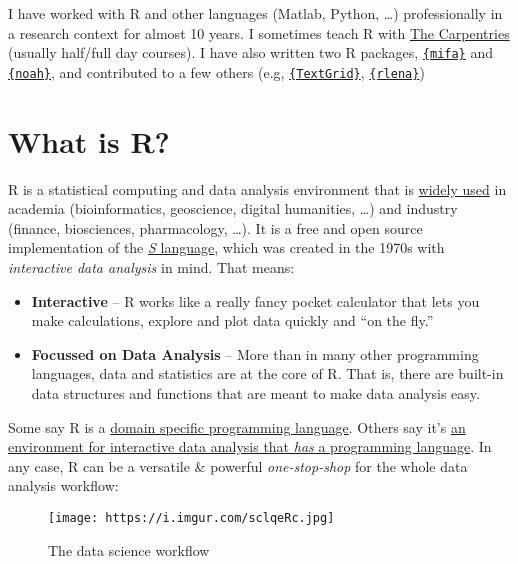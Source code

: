 \documentclass[
]{book}
\providecommand{\tightlist}{%
  \setlength{\itemsep}{0pt}\setlength{\parskip}{0pt}}
\begin{document}
I have worked with R and other languages (Matlab, Python, \ldots)
professionally in a research context for almost 10 years. I sometimes
teach R with
\href{https://www.ub.uio.no/english/writing-publishing/dsc/carpentry-uio/}{The
Carpentries} (usually half/full day courses). I have also written two R
packages, \href{https://teebusch.github.io/mifa/}{\texttt{\{mifa\}}} and
\href{https://teebusch.github.io/noah/}{\texttt{\{noah\}}}, and
contributed to a few others (e.g,
\href{https://github.com/patrickreidy/textgRid}{\texttt{\{TextGrid\}}},
\href{https://github.com/HomeBankCode/rlena}{\texttt{\{rlena\}}})

\hypertarget{what-is-r}{%
\section{What is R?}\label{what-is-r}}

R is a statistical computing and data analysis environment that is
\href{https://www.tiobe.com/tiobe-index/r/}{widely used} in academia
(bioinformatics, geoscience, digital humanities, \ldots) and industry
(finance, biosciences, pharmacology, \ldots). It is a free and open
source implementation of the
\href{https://en.wikipedia.org/wiki/S_(programming_language)}{\emph{S}
language}, which was created in the 1970s with \emph{interactive data
analysis} in mind. That means:

\begin{itemize}
\tightlist
\item
  \textbf{Interactive} -- R works like a really fancy pocket calculator
  that lets you make calculations, explore and plot data quickly and
  ``on the fly.''
\item
  \textbf{Focussed on Data Analysis} -- More than in many other
  programming languages, data and statistics are at the core of R. That
  is, there are built-in data structures and functions that are meant to
  make data analysis easy.
\end{itemize}

Some say R is a
\href{https://en.wikipedia.org/wiki/Domain-specific_language}{domain
specific programming language}. Others say it's
\href{https://youtu.be/6S9r_YbqHy8}{an environment for interactive data
analysis that \emph{has} a programming language}. In any case, R can be
a versatile \& powerful \emph{one-stop-shop} for the whole data analysis
workflow:

\begin{figure}
\centering
\texttt{[image: https://i.imgur.com/sclqeRc.jpg]}
\caption{The data science workflow}
\end{figure}
\end{document}
